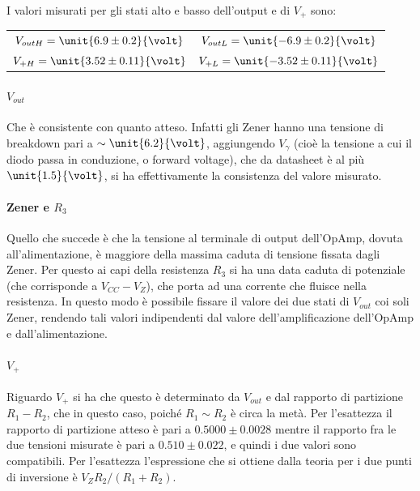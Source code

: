 \documentclass[10pt,a4paper]{article}
\begin{document}
I valori misurati per gli stati alto e basso dell'output e di $V_+$ sono:

\begin{table}[H]
	\centering
	\begin{tabular}{cc}
        $ V_{out H} = \unit{6.9 \pm 0.2}{\volt}$  & $V_{out L} = \unit{-6.9 \pm 0.2}{\volt}$\\
        $ V_{+ H} = \unit{3.52 \pm 0.11}{\volt}$  & $V_{+ L} = \unit{-3.52 \pm 0.11}{\volt}$
	\end{tabular}
\end{table}

\paragraph{$V_{out}$} Che è consistente con quanto atteso. Infatti gli Zener hanno una tensione di breakdown pari a $\sim \unit{6.2}{\volt}$, aggiungendo $V_\gamma$ (cioè la tensione a cui il diodo passa in conduzione, o forward voltage), che da datasheet è al più $\unit{1.5}{\volt}$, si ha effettivamente la consistenza del valore misurato.

\paragraph{Zener e $R_3$} Quello che succede è che la tensione al terminale di output dell'OpAmp, dovuta all'alimentazione, è maggiore della massima caduta di tensione fissata dagli Zener. Per questo ai capi della resistenza $R_3$ si ha una data caduta di potenziale (che corrisponde a $V_{CC}-V_Z$), che porta ad una corrente che fluisce nella resistenza. In questo modo è possibile fissare il valore dei due stati di $V_{out}$ coi soli Zener, rendendo tali valori indipendenti dal valore dell'amplificazione dell'OpAmp e dall'alimentazione.

\paragraph{$V_+$} Riguardo $V_+$ si ha che questo è determinato da $V_{out}$ e dal rapporto di partizione $R_1 - R_2$, che in questo caso, poiché $R_1 \sim R_2$ è circa la metà. Per l'esattezza il rapporto di partizione atteso è pari a $0.5000 \pm 0.0028$ mentre il rapporto fra le due tensioni misurate è pari a $0.510 \pm 0.022$, e quindi i due valori sono compatibili.
Per l'esattezza l'espressione che si ottiene dalla teoria per i due punti di inversione è $V_Z R_2/(R_1 + R_2)$.
\end{document}
